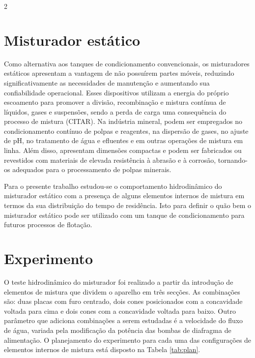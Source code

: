 \documentclass[a4paper,12pt,fleqn]{article}
\begin{document}
\begin{multicols}{2}
		\section{Misturador estático}
			Como alternativa aos tanques de condicionamento convencionais, os misturadores estáticos apresentam a vantagem de não possuírem partes móveis, reduzindo significativamente as necessidades de manutenção e aumentando sua confiabilidade operacional. Esses dispositivos utilizam a energia do próprio escoamento para promover a divisão, recombinação e mistura contínua de líquidos, gases e suspensões, sendo a perda de carga uma consequência do processo de mistura (CITAR). Na indústria mineral, podem ser empregados no condicionamento contínuo de polpas e reagentes, na dispersão de gases, no ajuste de pH, no tratamento de água e efluentes e em outras operações de mistura em linha. Além disso, apresentam dimensões compactas e podem ser fabricados ou revestidos com materiais de elevada resistência à abrasão e à corrosão, tornando-os adequados para o processamento de polpas minerais.

			Para o presente trabalho estudou-se o comportamento hidrodinâmico do misturador estático com a presença de alguns elementos internos de mistura em termos da sua distribuição do tempo de residência. Isto para definir o quão bem o misturador estático pode ser utilizado com um tanque de condicionamento para futuros processos de flotação.

			\section{Experimento}
			O teste hidrodinâmico do misturador foi realizado a partir da introdução de elementos de mistura que dividem o aparelho em três secções. As combinações são: duas placas com furo centrado, dois cones posicionados com a concavidade voltada para cima e dois cones com a concavidade voltada para baixo. Outro parâmetro que adiciona combinações a serem estudadas é a velocidade do fluxo de água, variada pela modificação da potência das bombas de diafragma de alimentação. O planejamento do experimento para cada uma das configurações de elementos internos de mistura está disposto na Tabela \ref{tab:plan}.

		\begin{table}[H]
			\centering
			\fontsize{10}{12}\selectfont 
			\caption{Planejamento experimental.}
			\label{tab:plan}


\end{table}
\end{multicols}
\end{document}

